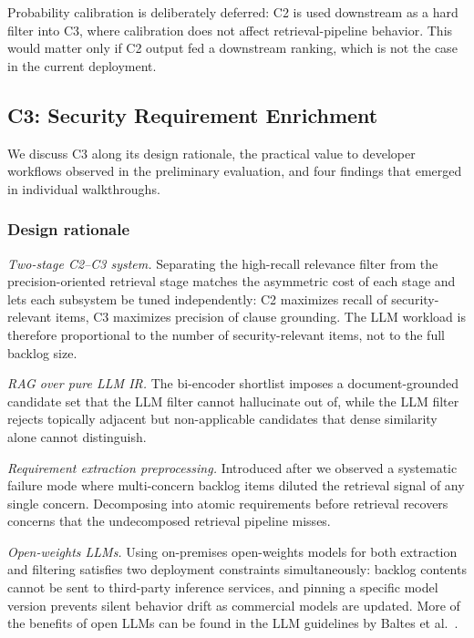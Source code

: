 Probability calibration is deliberately deferred: C2 is used downstream as a hard filter into C3, where calibration does not affect retrieval-pipeline behavior.
This would matter only if C2 output fed a downstream ranking, which is not the case in the current deployment.

\subsection*{C3: Security Requirement Enrichment}\label{sec:discussion-c3}

We discuss C3 along its design rationale, the practical value to developer workflows observed in the preliminary evaluation, and four findings that emerged in individual walkthroughs.

\subsubsection*{Design rationale}

\emph{Two-stage C2--C3 system.}
Separating the high-recall relevance filter from the precision-oriented retrieval stage matches the asymmetric cost of each stage and lets each subsystem be tuned independently: C2 maximizes recall of security-relevant items, C3 maximizes precision of clause grounding.
The LLM workload is therefore proportional to the number of security-relevant items, not to the full backlog size.

\emph{RAG over pure LLM IR.}
The bi-encoder shortlist imposes a document-grounded candidate set that the LLM filter cannot hallucinate out of, while the LLM filter rejects topically adjacent but non-applicable candidates that dense similarity alone cannot distinguish.

\emph{Requirement extraction preprocessing.}
Introduced after we observed a systematic failure mode where multi-concern backlog items diluted the retrieval signal of any single concern.
Decomposing into atomic requirements before retrieval recovers concerns that the undecomposed retrieval pipeline misses.

\emph{Open-weights LLMs.}
Using on-premises open-weights models for both extraction and filtering satisfies two deployment constraints simultaneously: backlog contents cannot be sent to third-party inference services, and pinning a specific model version prevents silent behavior drift as commercial models are updated. More of the benefits of open LLMs can be found in the LLM guidelines by Baltes et al.~\cite{baltes2026guidelinesempiricalstudiessoftware}.


